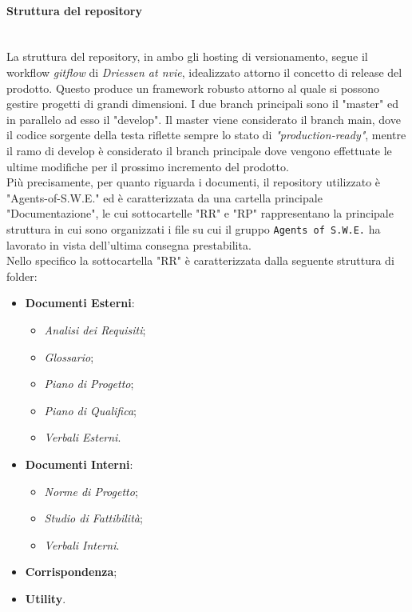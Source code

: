 \paragraph{Struttura del repository} \-\\ 
La struttura del repository\glossario, in ambo gli hosting di versionamento, segue il workflow \textit{gitflow} di \textit{Driessen at nvie}, idealizzato attorno il concetto di release del prodotto. Questo produce un framework robusto attorno al quale si possono gestire progetti di grandi dimensioni. I due branch principali sono il "master" ed in parallelo ad esso il "develop". 
Il master viene considerato il branch main, dove il codice sorgente della testa riflette sempre lo stato di \textit{"production-ready"},
mentre il ramo di develop è considerato il branch principale dove vengono effettuate le ultime modifiche per il prossimo incremento del prodotto.\\
Più precisamente, per quanto riguarda i documenti, il repository utilizzato è "Agents-of-S.W.E." ed è caratterizzata da una cartella principale "Documentazione", le cui sottocartelle "RR" e "RP" rappresentano la principale struttura in cui sono organizzati i file su cui il gruppo \texttt{Agents of S.W.E.} ha lavorato in vista dell'ultima consegna prestabilita.\\
	Nello specifico la sottocartella "RR" è caratterizzata dalla seguente struttura di folder:
	\begin{itemize}
	\item \textbf{Documenti Esterni}:
		\begin{itemize}
		\item \textit{Analisi dei Requisiti};
		\item \textit{Glossario};
		\item \textit{Piano di Progetto};
		\item \textit{Piano di Qualifica};
		\item \textit{Verbali Esterni}.
		\end{itemize}
	\item \textbf{Documenti Interni}:
		\begin{itemize}
		\item \textit{Norme di Progetto};
		\item \textit{Studio di Fattibilità};
		\item \textit{Verbali Interni}.
		\end{itemize}
	\item \textbf{Corrispondenza};
	\item \textbf{Utility}.
	\end{itemize}
